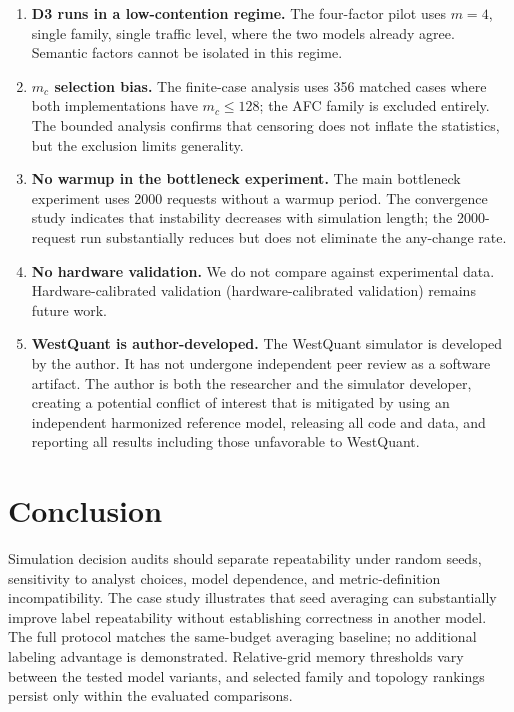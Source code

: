 \documentclass[aps,prapplied,reprint,superscriptaddress]{revtex4-2}
\begin{document}
\begin{enumerate}[leftmargin=2em]
\item \textbf{D3 runs in a low-contention regime.} The four-factor pilot uses $m = 4$, single family, single traffic level, where the two models already agree. Semantic factors cannot be isolated in this regime.

\item \textbf{$m_c$ selection bias.} The finite-case analysis uses 356 matched cases where both implementations have $m_c \leq 128$; the AFC family is excluded entirely. The bounded analysis confirms that censoring does not inflate the statistics, but the exclusion limits generality.

\item \textbf{No warmup in the bottleneck experiment.} The main bottleneck experiment uses 2000 requests without a warmup period. The convergence study indicates that instability decreases with simulation length; the 2000-request run substantially reduces but does not eliminate the any-change rate.

\item \textbf{No hardware validation.} We do not compare against experimental data. Hardware-calibrated validation (hardware-calibrated validation) remains future work.

\item \textbf{WestQuant is author-developed.} The WestQuant simulator is developed by the author. It has not undergone independent peer review as a software artifact. The author is both the researcher and the simulator developer, creating a potential conflict of interest that is mitigated by using an independent harmonized reference model, releasing all code and data, and reporting all results including those unfavorable to WestQuant.
\end{enumerate}

\section{Conclusion}
\label{sec:conclusion}

Simulation decision audits should separate repeatability under random seeds, sensitivity to analyst choices, model dependence, and metric-definition incompatibility. The case study illustrates that seed averaging can substantially improve label repeatability without establishing correctness in another model. The full protocol matches the same-budget averaging baseline; no additional labeling advantage is demonstrated. Relative-grid memory thresholds vary between the tested model variants, and selected family and topology rankings persist only within the evaluated comparisons.
\end{document}
